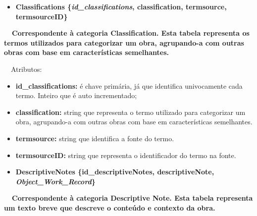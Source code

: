 \documentclass[letterpaper]{article}
\newcommand\textstyleStrongEmphasis[1]{\textbf{#1}}
\newcommand\liststyleLi{%
\renewcommand\labelitemi{{\textbullet}}
\renewcommand\labelitemii{[27A2?]}
\renewcommand\labelitemiii{{\textbullet}}
\renewcommand\labelitemiv{{\textbullet}}
}
\newcommand\liststyleLxiv{%
\renewcommand\labelitemi{[27A2?]}
\renewcommand\labelitemii{[27A2?]}
\renewcommand\labelitemiii{[27A2?]}
\renewcommand\labelitemiv{[27A2?]}
}
\begin{document}
\bigskip

\liststyleLi
\begin{itemize}
\item {\bfseries
Classifications\textmd{
\{}\textmd{\textit{id\_classifications}}\textmd{, classification,
termsource, termsourceID\}}}
\end{itemize}
{\bfseries
\foreignlanguage{english}{\textmd{\ \ Correspondente \`a categoria
}}\textstyleStrongEmphasis{\foreignlanguage{english}{Classification}}\foreignlanguage{english}{\textmd{.
Esta
}}\textstyleStrongEmphasis{\foreignlanguage{english}{\textmd{tabela}}}\foreignlanguage{english}{\textmd{
representa os termos utilizados para categorizar um obra, agrupando-a
com outras obras com base em caracter\'isticas semelhantes.}}}


\bigskip

{
\ \ Atributos:}

\liststyleLxiv
\begin{itemize}
\item {
\textbf{id\_}\textbf{classifications}\textbf{: }\'e chave prim\'aria,
j\'a que identifica univocamente cada termo. Inteiro que \'e auto
incrementado;}
\item {
\textbf{classification: }string que representa o termo utilizado para
categorizar um obra, agrupando-a com outras obras com base em
caracter\'isticas semelhantes.}
\item {
\textbf{termsource: }string que identifica a fonte do termo.}
\item {
\textbf{termsourceID:} string que representa o identificador do termo na
fonte.}
\end{itemize}

\bigskip

\liststyleLi
\begin{itemize}
\item {\bfseries
DescriptiveNotes\textmd{ \{}\textmd{id\_descriptiveNotes}\textmd{,
descriptiveNote, }\textmd{\textit{Object\_Work\_Record}}\textmd{\}}}
\end{itemize}
{\bfseries
\foreignlanguage{english}{\ \ }\foreignlanguage{english}{\textmd{Correspondente
\`a categoria
}}\textstyleStrongEmphasis{\foreignlanguage{english}{Descriptive
Note}}\foreignlanguage{english}{\textmd{. Esta
}}\textstyleStrongEmphasis{\foreignlanguage{english}{\textmd{tabela}}}\foreignlanguage{english}{\textmd{
representa um texto breve que descreve o conte\'udo e contexto da
obra.}}}
\end{document}
